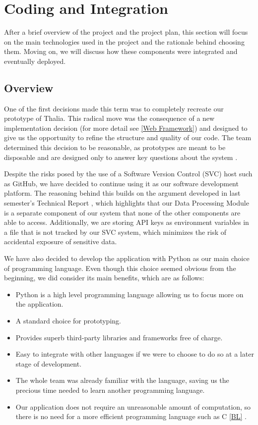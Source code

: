 \documentclass[main.tex]{subfiles}
\begin{document}
\section{Coding and Integration}

After a brief overview of the project and the project plan, this section will focus on the main technologies used in the project and the rationale behind choosing them. Moving on, we will discuss how these components were integrated and eventually deployed.

\subsection{Overview}

One of the first decisions made this term was to completely recreate our prototype of Thalia. This radical move was the consequence of a new implementation decision (for more detail see \ref{Web Framework}) and designed to give us the opportunity to refine the structure and quality of our code. The team determined this decision to be reasonable, as prototypes are meant to be disposable and are designed only to answer key questions about the system \cite{pragmaticprog}.

Despite the risks posed by the use of a Software Version Control (SVC) host such as GitHub, we have decided to continue using it as our software development platform. The reasoning behind this builds on the argument developed in last semester's Technical Report \cite{TR}, which highlights that our Data Processing Module is a separate component of our system that none of the other components are able to access. Additionally, we are storing API keys as environment variables in a file that is not tracked by our SVC system, which minimizes the risk of accidental exposure of sensitive data.

We have also decided to develop the application with Python as our main choice of programming language. Even though this choice seemed obvious from the beginning, we did consider its main benefits, which are as follows:

\begin{itemize}
    \item Python is a high level programming language allowing us to focus more on the application.
    \item A standard choice for prototyping.
    \item Provides superb third-party libraries and frameworks free of charge.
    \item Easy to integrate with other languages if we were to choose to do so at a later stage of development.
    \item The whole team was already familiar with the language, saving us the precious time needed to learn another programming language.
    \item Our application does not require an unreasonable amount of computation, so there is no need for a more efficient programming language such as C \ref{BL} \cite{languagescomparison}.
\end{itemize}
\end{document}
